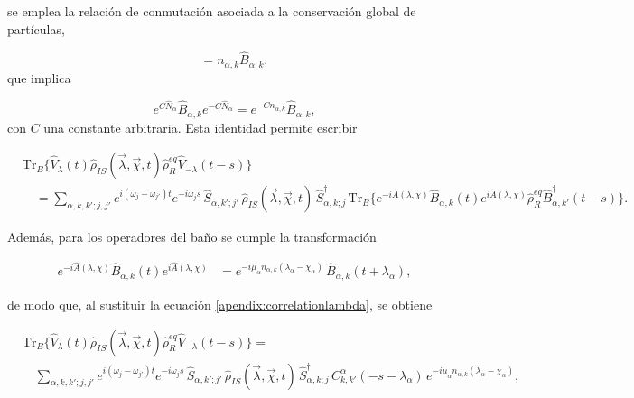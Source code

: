 \begin{appendixs}
se emplea la relación de conmutación asociada a la conservación global de partículas,  

\begin{equation*}
    [\hat{B}_{\alpha,k},\hat{N}_{\alpha}] = n_{\alpha,k}\hat{B}_{\alpha,k},
\end{equation*}
que implica 

\begin{equation}
    e^{C\hat{N}_{\alpha}}\hat{B}_{\alpha,k}e^{-C\hat{N}_{\alpha}} = e^{-Cn_{\alpha,k}}\hat{B}_{\alpha,k}, 
    \label{apendix:conservationparticle}
\end{equation}
con $C$ una constante arbitraria. Esta identidad permite escribir

\begin{align*}
   & \mathrm{Tr}_{B}\{ \hat{V}_{\lambda}(t)\hat{\rho}_{IS}(\vec{\lambda},\vec{\chi},t)\hat{\rho}_{R}^{eq}\hat{V}_{-\lambda}(t-s) \} \\
   &\quad = \sum_{\alpha,k,k';j,j'} e^{i(\omega_{j}-\omega_{j'})t} e^{-i\omega_{j}s}\, 
   \hat{S}_{\alpha,k';j'}\, \hat{\rho}_{IS}(\vec{\lambda},\vec{\chi},t)\, \hat{S}^{\dagger}_{\alpha,k;j}\,
   \mathrm{Tr}_{B}\{e^{-i\hat{A}(\lambda,\chi)} \hat{B}_{\alpha,k}(t)e^{i\hat{A}(\lambda,\chi)}\hat{\rho}_{R}^{eq}\hat{B}^{\dagger}_{\alpha,k'}(t-s) \}.
\end{align*}

Además, para los operadores del baño se cumple la transformación

\begin{align}
    e^{-i\hat{A}(\lambda,\chi)} \hat{B}_{\alpha,k}(t)e^{i\hat{A}(\lambda,\chi)} 
    &= e^{-i\mu_{\alpha}n_{\alpha,k}(\lambda_{\alpha}-\chi_{\alpha})}\, \hat{B}_{\alpha,k}(t+\lambda_{\alpha}), 
    \label{apendix:correlationlambda}
\end{align}

de modo que, al sustituir la ecuación \eqref{apendix:correlationlambda}, se obtiene  

\begin{align*}
 & \mathrm{Tr}_{B}\{ \hat{V}_{\lambda}(t)\hat{\rho}_{IS}(\vec{\lambda},\vec{\chi},t)\hat{\rho}_{R}^{eq}\hat{V}_{-\lambda}(t-s) \} = \\
 & \quad \sum_{\alpha,k,k';j,j'} e^{i(\omega_{j}-\omega_{j'})t} e^{-i\omega_{j}s}\, 
 \hat{S}_{\alpha,k';j'}\, \hat{\rho}_{IS}(\vec{\lambda},\vec{\chi},t)\, \hat{S}^{\dagger}_{\alpha,k;j}\,
 C^{\alpha}_{k,k'}(-s-\lambda_{\alpha})\, e^{-i\mu_{\alpha}n_{\alpha,k}(\lambda_{\alpha}-\chi_{\alpha})},
 \end{align*}


\end{appendixs}
